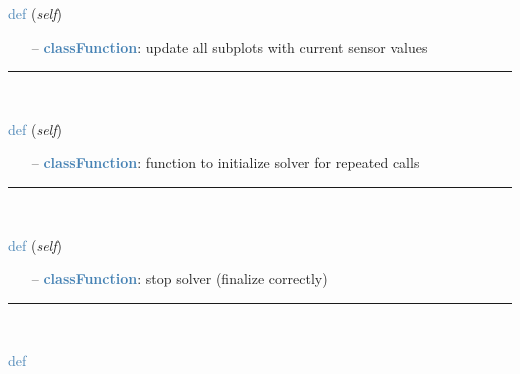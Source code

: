 \begin{itemize}[leftmargin=1.4cm]
\begin{itemize}[leftmargin=0.5cm]
\begin{itemize}[leftmargin=1.4cm]
\begin{itemize}[leftmargin=1.4cm]
\begin{itemize}[leftmargin=0.5cm]
\begin{itemize}[leftmargin=1.4cm]
\begin{itemize}[leftmargin=0.5cm]
\begin{itemize}[leftmargin=1.4cm]
\begin{itemize}[leftmargin=1.4cm]
\begin{flushleft}
\noindent \textcolor{steelblue}{def {\bf {}}}\label{sec:interactive:InteractiveDialog:UpdatePlots}
({\it self})
\end{flushleft}
\setlength{\itemindent}{0.7cm}
\begin{itemize}[leftmargin=0.7cm]
  \item[--]  \textcolor{steelblue}{\bf classFunction}: update all subplots with current sensor values\vspace{12pt}\end{itemize}
%
\noindent\rule{8cm}{0.75pt}\vspace{1pt} \\ 
\begin{flushleft}
\noindent \textcolor{steelblue}{def {\bf {}}}\label{sec:interactive:InteractiveDialog:InitializeSolver}
({\it self})
\end{flushleft}
\setlength{\itemindent}{0.7cm}
\begin{itemize}[leftmargin=0.7cm]
  \item[--]  \textcolor{steelblue}{\bf classFunction}: function to initialize solver for repeated calls\vspace{12pt}\end{itemize}
%
\noindent\rule{8cm}{0.75pt}\vspace{1pt} \\ 
\begin{flushleft}
\noindent \textcolor{steelblue}{def {\bf {}}}\label{sec:interactive:InteractiveDialog:FinalizeSolver}
({\it self})
\end{flushleft}
\setlength{\itemindent}{0.7cm}
\begin{itemize}[leftmargin=0.7cm]
  \item[--]  \textcolor{steelblue}{\bf classFunction}: stop solver (finalize correctly)\vspace{12pt}\end{itemize}
%
\noindent\rule{8cm}{0.75pt}\vspace{1pt} \\ 
\begin{flushleft}
\noindent \textcolor{steelblue}{def {\bf {}}}\label{sec:interactive:InteractiveDialog:RunSimulationPeriod}

\end{flushleft}
\end{itemize}
\end{itemize}
\end{itemize}
\end{itemize}
\end{itemize}
\end{itemize}
\end{itemize}
\end{itemize}
\end{itemize}
